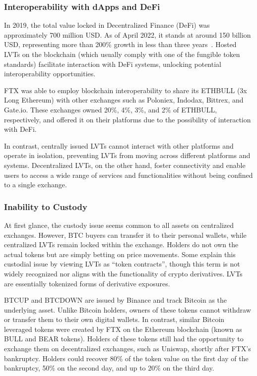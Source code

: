 \subsubsection{Interoperability with dApps and DeFi}
In 2019, the total value locked in Decentralized Finance (DeFi) was approximately 700 million USD. As of April 2022, it stands at around 150 billion USD, representing more than 200\% growth in less than three years~\cite{werner2022sok}. Hosted LVTs on the blockchain (which usually comply with one of the fungible token standards) facilitate interaction with DeFi systems, unlocking potential interoperability opportunities. 
\begin{example}
	FTX was able to employ blockchain interoperability to share its ETHBULL (3x Long Ethereum) with other exchanges such as Poloniex, Indodax, Bittrex, and Gate.io. These exchanges owned 20\%, 4\%, 3\%, and 2\% of ETHBULL, respectively, and offered it on their platforms due to the possibility of interaction with DeFi.
\end{example}
In contrast, centrally issued LVTs cannot interact with other platforms and operate in isolation, preventing LVTs from moving across different platforms and systems. Decentralized LVTs, on the other hand, foster connectivity and enable users to access a wide range of services and functionalities without being confined to a single exchange.

\subsubsection{Inability to Custody}
At first glance, the custody issue seems common to all assets on centralized exchanges. However, BTC buyers can transfer it to their personal wallets, while centralized LVTs remain locked within the exchange. Holders do not own the actual tokens but are simply betting on price movements. Some explain this custodial issue by viewing LVTs as ``token contracts'', though this term is not widely recognized nor aligns with the functionality of crypto derivatives. LVTs are essentially tokenized forms of derivative exposures.
\begin{example}
	BTCUP and BTCDOWN are issued by Binance and track Bitcoin as the underlying asset. Unlike Bitcoin holders, owners of these tokens cannot withdraw or transfer them to their own digital wallets. In contrast, similar Bitcoin leveraged tokens were created by FTX on the Ethereum blockchain (known as BULL and BEAR tokens). Holders of these tokens still had the opportunity to exchange them on decentralized exchanges, such as Uniswap, shortly after FTX's bankruptcy. Holders could recover 80\% of the token value on the first day of the bankruptcy, 50\% on the second day, and up to 20\% on the third day.
\end{example}

